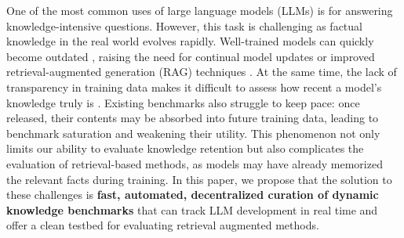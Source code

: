\documentclass[11pt]{article}
\begin{document}
One of the most common uses of large language models (LLMs) is for answering knowledge-intensive questions.  However, this task is challenging as factual knowledge in the real world evolves rapidly. 
Well-trained models can quickly become outdated \citep{li-etal-2024-open-source}, raising the need for continual model updates \citep{liška2022streamingqabenchmarkadaptationnew} or improved retrieval-augmented generation (RAG) techniques \citep{lewis2020retrieval}. 
At the same time, the lack of transparency in training data makes it difficult to assess how recent a model’s knowledge truly is \citep{chengdated2024}. 
Existing benchmarks also struggle to keep pace: once released, their contents may be absorbed into future training data, leading to benchmark saturation and weakening their utility. 
This phenomenon not only limits our ability to evaluate knowledge retention but also complicates the evaluation of retrieval-based methods, as models may have already memorized the relevant facts during training. 
In this paper, we propose that the solution to these challenges is {\bf fast, automated, decentralized curation of dynamic knowledge benchmarks} that can track LLM development in real time and offer a clean testbed for evaluating retrieval augmented methods.

\begin{table*}[t]
    \centering
    \footnotesize
    \caption{Comparison of dynamic QA benchmarks in terms of human involvement, automation, update frequency, and scale. Daily Oracle is omitted as it focuses on event forecasting rather than factual QA.}
    \label{tab:dynamic-benchmarks}
\end{table*}
\end{document}
